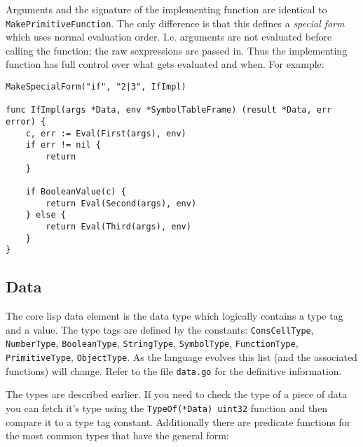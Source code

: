 \documentclass{article}
\begin{document}
Arguments and the signature of the implementing function are identical to
\verb|MakePrimitiveFunction|. The only difference is that this defines a \emph{special form}
which uses normal evaluation order. I.e. arguments are not evaluated before calling the
function; the raw sexpressions are passed in. Thus the implementing function has full control
over what gets evaluated and when. For example:

\begin{verbatim}
MakeSpecialForm("if", "2|3", IfImpl)

func IfImpl(args *Data, env *SymbolTableFrame) (result *Data, err error) {
    c, err := Eval(First(args), env)
    if err != nil {
        return
    }

    if BooleanValue(c) {
        return Eval(Second(args), env)
    } else {
        return Eval(Third(args), env)
    }
}
\end{verbatim}

\subsection{Data}\label{sec:data}

The core lisp data element is the data type which logically contains a type tag and a value.
The type tags are defined by the constants: \verb|ConsCellType|, \verb|NumberType|,
\verb|BooleanType|, \verb|StringType|, \verb|SymbolType|, \verb|FunctionType|,
\verb|PrimitiveType|, \verb|ObjectType|. As the language evolves this list (and the
associated functions) will change. Refer to the file \verb|data.go| for
the definitive information.

The types are described earlier. If you need to check the type of a piece of data you can
fetch it’s type using the \verb|TypeOf(*Data) uint32| function and then compare it to a type
tag constant. Additionally there are predicate functions for the most common types that have
the general form:
\end{document}

